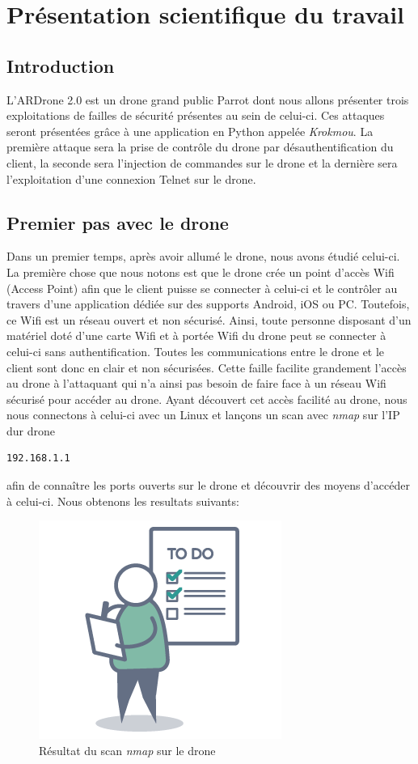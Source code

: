 \section{Présentation scientifique du travail}
\subsection{Introduction}
L'ARDrone 2.0 est un drone grand public Parrot dont nous allons présenter trois exploitations de failles de sécurité présentes au sein de celui-ci. Ces attaques seront présentées grâce à une application en Python appelée \textit{Krokmou}. La première attaque sera la prise de contrôle du drone par désauthentification du client, la seconde sera l'injection de commandes sur le drone et la dernière sera l'exploitation d'une connexion Telnet sur le drone.

\subsection{Premier pas avec le drone}
Dans un premier temps, après avoir allumé le drone, nous avons étudié celui-ci. La première chose que nous notons est que le drone crée un point d'accès Wifi (Access Point) afin que le client puisse se connecter à celui-ci et le contrôler au travers d'une application dédiée sur des supports Android, iOS ou PC. Toutefois, ce Wifi est un réseau ouvert et non sécurisé. Ainsi, toute personne disposant d'un matériel doté d'une carte Wifi et à portée Wifi du drone peut se connecter à celui-ci sans authentification. Toutes les communications entre le drone et le client sont donc en clair et non sécurisées. Cette faille facilite grandement l'accès au drone à l'attaquant qui n'a ainsi pas besoin de faire face à un réseau Wifi sécurisé pour accéder au drone. Ayant découvert cet accès facilité au drone, nous nous connectons à celui-ci avec un Linux et lançons un scan avec \textit{nmap} sur l'IP dur drone \begin{verbatim}192.168.1.1\end{verbatim} afin de connaître les ports ouverts sur le drone et découvrir des moyens d'accéder à celui-ci. Nous obtenons les resultats suivants:

\begin{figure}[H]
  \centering
  \includegraphics[scale=0.3]{images/todo.png}
  \caption{Résultat du scan \textit{nmap} sur le drone}
\end{figure}

